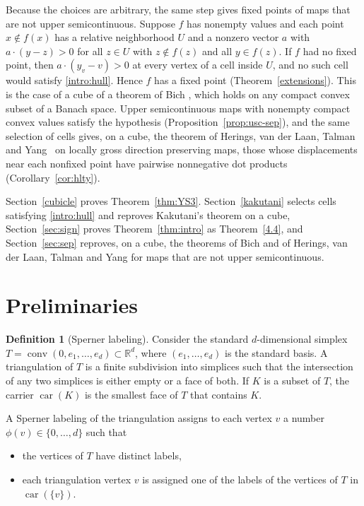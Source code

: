 \documentclass[11pt]{amsart}
\theoremstyle{definition}
\newtheorem{defn}[thm]{Definition}
\theoremstyle{remark}
\numberwithin{equation}{section}
\newcommand{\R}{\mathbb R}
\DeclareMathOperator{\conv}{conv}
\DeclareMathOperator{\car}{car}
\begin{document}
Because the choices are arbitrary, the same step gives fixed points of maps that are not upper semicontinuous. Suppose $f$ has nonempty values and each point $x\notin f(x)$ has a relative neighborhood $U$ and a nonzero vector $a$ with $a\cdot(y-z)>0$ for all $z\in U$ with $z\notin f(z)$ and all $y\in f(z)$. If $f$ had no fixed point, then $a\cdot(y_v-v)>0$ at every vertex of a cell inside $U$, and no such cell would satisfy \eqref{intro:hull}. Hence $f$ has a fixed point (Theorem~\ref{extensions}). This is the case of a cube of a theorem of Bich \cite[Theorem~3.2]{Bich06}, which holds on any compact convex subset of a Banach space. Upper semicontinuous maps with nonempty compact convex values satisfy the hypothesis (Proposition~\ref{prop:usc-sep}), and the same selection of cells gives, on a cube, the theorem of Herings, van der Laan, Talman and Yang~\cite{HLTY} on locally gross direction preserving maps, those whose displacements near each nonfixed point have pairwise nonnegative dot products (Corollary~\ref{cor:hlty}).

Section~\ref{cubicle} proves Theorem~\ref{thm:YS3}. Section~\ref{kakutani} selects cells satisfying \eqref{intro:hull} and reproves Kakutani's theorem on a cube, Section~\ref{sec:sign} proves Theorem~\ref{thm:intro} as Theorem~\ref{4.4}, and Section~\ref{sec:sep} reproves, on a cube, the theorems of Bich and of Herings, van der Laan, Talman and Yang for maps that are not upper semicontinuous.

\section{Preliminaries}\label{pre}
\begin{defn}[Sperner labeling]
Consider the standard $d$-dimensional simplex $T=\conv(0,e_1,\ldots,e_d)\subset\R^d$, where $(e_1,\ldots,e_d)$ is the standard basis. A triangulation of $T$ is a finite subdivision into simplices such that the intersection of any two simplices is either empty or a face of both. If $K$ is a subset of $T$, the carrier $\car(K)$ is the smallest face of $T$ that contains $K$.

A Sperner labeling of the triangulation assigns to each vertex $v$ a number $\phi(v)\in\{0,\ldots,d\}$ such that
\begin{itemize}
\item[(i)] the vertices of $T$ have distinct labels,
\item[(ii)] each triangulation vertex $v$ is assigned one of the labels of the vertices of $T$ in $\car(\{v\})$.
\end{itemize}
\end{defn}
\end{document}

